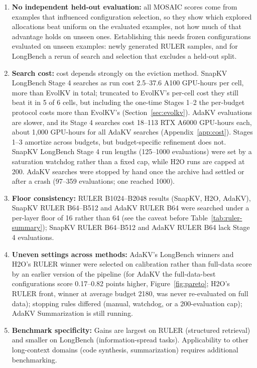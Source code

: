 \documentclass[11pt]{article}
\begin{document}
\begin{enumerate}
\item \textbf{No independent held-out evaluation:} all MOSAIC scores come from examples that influenced configuration selection, so they show which explored allocations beat uniform on the evaluated examples, not how much of that advantage holds on unseen ones. Establishing this needs frozen configurations evaluated on unseen examples: newly generated RULER samples, and for LongBench a rerun of search and selection that excludes a held-out split.
\item \textbf{Search cost:} cost depends strongly on the eviction method. SnapKV LongBench Stage 4 searches as run cost 2.5--37.6 A100 GPU-hours per cell, more than EvolKV in total; truncated to EvolKV's per-cell cost they still beat it in 5 of 6 cells, but including the one-time Stages 1--2 the per-budget protocol costs more than EvolKV's (Section~\ref{sec:evolkv}). AdaKV evaluations are slower, and its Stage 4 searches cost 18--113 RTX A6000 GPU-hours each, about 1{,}000 GPU-hours for all AdaKV searches (Appendix~\ref{app:cost}). Stages 1--3 amortize across budgets, but budget-specific refinement does not. SnapKV LongBench Stage 4 run lengths (125--1000 evaluations) were set by a saturation watchdog rather than a fixed cap, while H2O runs are capped at 200. AdaKV searches were stopped by hand once the archive had settled or after a crash (97--359 evaluations; one reached 1000).
\item \textbf{Floor consistency:} RULER B1024--B2048 results (SnapKV, H2O, AdaKV), SnapKV RULER B64--B512 and AdaKV RULER B64 were searched under a per-layer floor of 16 rather than 64 (see the caveat before Table~\ref{tab:ruler-summary}); SnapKV RULER B64--B512 and AdaKV RULER B64 lack Stage 4 evaluations.
\item \textbf{Uneven settings across methods:} AdaKV's LongBench winners and H2O's RULER winner were selected on calibration rather than full-data score by an earlier version of the pipeline (for AdaKV the full-data-best configurations score 0.17--0.82 points higher, Figure~\ref{fig:pareto}; H2O's RULER front, winner at average budget 2180, was never re-evaluated on full data); stopping rules differed (manual, watchdog, or a 200-evaluation cap); AdaKV Summarization is still running.
\item \textbf{Benchmark specificity:} Gains are largest on RULER (structured retrieval) and smaller on LongBench (information-spread tasks). Applicability to other long-context domains (code synthesis, summarization) requires additional benchmarking.

\end{enumerate}
\end{document}
